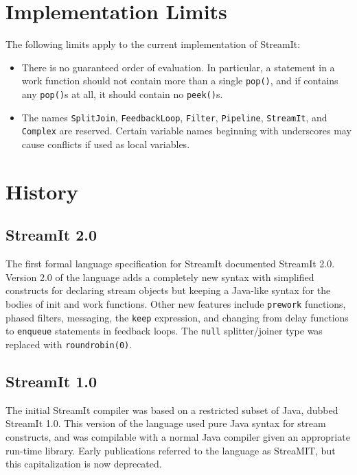 \documentclass[11pt]{article}
\begin{document}
\section{Implementation Limits}

The following limits apply to the current implementation of StreamIt:

\begin{itemize}
\item There is no guaranteed order of evaluation.  In particular, a
  statement in a work function should not contain more than a single
  \lstinline|pop()|, and if contains any \lstinline|pop()|s at all, it
  should contain no \lstinline|peek()|s.
  
\item The names \lstinline|SplitJoin|, \lstinline|FeedbackLoop|,
  \lstinline|Filter|, \lstinline|Pipeline|, \lstinline|StreamIt|, and
  \lstinline|Complex| are reserved.  Certain variable names beginning
  with underscores may cause conflicts if used as local variables.

\end{itemize}

\section{History}

\subsection{StreamIt 2.0}

The first formal language specification for StreamIt documented
StreamIt 2.0.  Version 2.0 of the language adds a completely new
syntax with simplified constructs for declaring stream objects but
keeping a Java-like syntax for the bodies of init and work functions.
Other new features include \lstinline|prework| functions, phased
filters, messaging, the \lstinline|keep| expression, and changing from
delay functions to \lstinline|enqueue| statements in feedback loops.
The \lstinline|null| splitter/joiner type was replaced with
\lstinline|roundrobin(0)|.

\subsection{StreamIt 1.0}

The initial StreamIt compiler was based on a restricted subset of
Java, dubbed StreamIt 1.0.  This version of the language used pure
Java syntax for stream constructs, and was compilable with a normal
Java compiler given an appropriate run-time library.  Early
publications referred to the language as StreaMIT, but this
capitalization is now deprecated.
\end{document}
